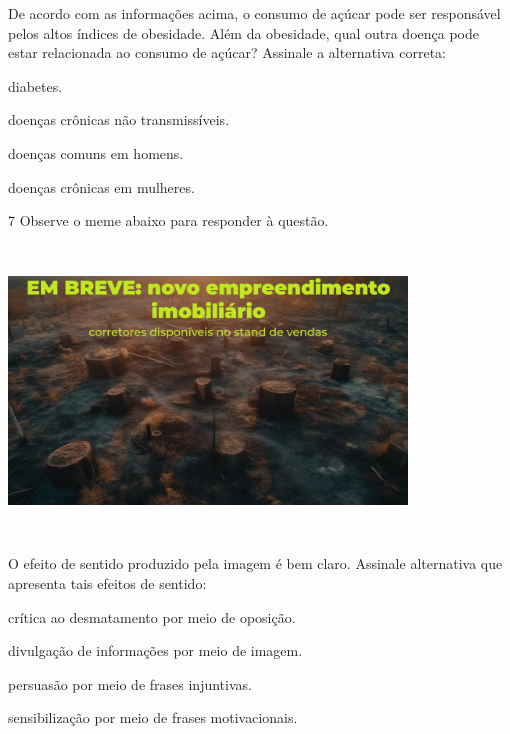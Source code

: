 
De acordo com as informações acima, o consumo de açúcar pode ser
responsável pelos altos índices de obesidade. Além da obesidade, qual
outra doença pode estar relacionada ao consumo de açúcar? Assinale a
alternativa correta:

\begin{escolha}

  \item diabetes.
  
  \item doenças crônicas não transmissíveis.
  
  \item doenças comuns em homens.
  
  \item doenças crônicas em mulheres. 

\end{escolha}

\num{7} Observe o meme abaixo para responder à questão.

\includegraphics[width=4.16667in,height=3.03125in]{imgSAEB_7_POR/media/image21.png}

O efeito de sentido produzido pela imagem é bem claro. Assinale
alternativa que apresenta tais efeitos de sentido:

\begin{escolha}

    \item crítica ao desmatamento por meio de oposição.

    \item divulgação de informações por meio de imagem.

    \item persuasão por meio de frases injuntivas. 

    \item sensibilização por meio de frases motivacionais. 

\end{escolha}

